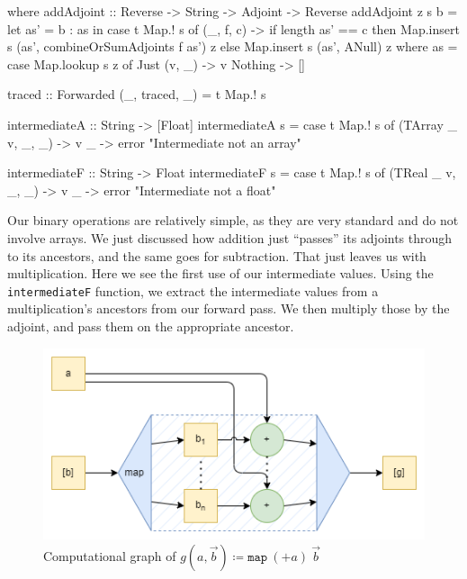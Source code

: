 \begin{haskell}
                where    
                    addAdjoint :: Reverse -> String -> Adjoint -> Reverse
                    addAdjoint z s b =
                        let as' = b : as
                        in  case t Map.! s of
                            (_, f, c) ->
                                if   length as' == c
                                then Map.insert s (as', combineOrSumAdjoints f as') z
                                else Map.insert s (as', ANull) z
                        where
                            as = case Map.lookup s z of
                                Just (v, _) -> v
                                Nothing     -> []

                    traced :: Forwarded
                    (_, traced, _) = t Map.! s

                    intermediateA :: String -> [Float]
                    intermediateA s = case t Map.! s of
                        (TArray _ v, _, _) -> v
                        _                  -> error "Intermediate not an array"

                    intermediateF :: String -> Float
                    intermediateF s = case t Map.! s of
                        (TReal _ v, _, _) -> v
                        _                 -> error "Intermediate not a float"
        \end{haskell}

        Our binary operations are relatively simple, as they are very standard and do not involve arrays.
        We just discussed how addition just ``passes'' its adjoints through to its ancestors, and the same goes for subtraction.
        That just leaves us with multiplication.
        Here we see the first use of our intermediate values.
        Using the \texttt{intermediateF} function, we extract the intermediate values from a multiplication's ancestors from our forward pass.
        We then multiply those by the adjoint, and pass them on the appropriate ancestor.

        \begin{figure}[htb]
            \centering
            \includegraphics[scale=0.5]{diagrams/map_example.png}
            \caption{Computational graph of $g(a,\vec{b})\coloneqq\texttt{map}\ (+a)\ \vec{b}$}
            \label{fig:map_graph}
        \end{figure}

